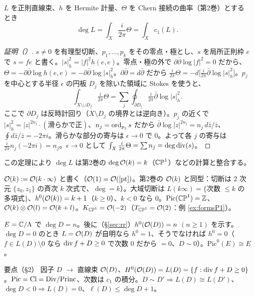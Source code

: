 \begin{thm}[$\deg=c_1$]\label{thm:degc1}
$L$ を正則直線束、$h$ を Hermite 計量、$\Theta$ を Chern 接続の曲率（第2巻）とするとき
\[
\deg L=\int_X\frac{i}{2\pi}\Theta=\int_Xc_1(L).
\]
\end{thm}
\begin{proof}[証明（\tP）]
$s\ne0$ を有理型切断、$p_1,\dots,p_k$ をその零点・極とし、$s$ を局所正則枠 $e$ で $s=fe$ と書く。$|s|^2_h=|f|^2h(e,e)$。零点・極の外で $\partial\bar\partial\log|f|^2=0$ だから、$\Theta=-\partial\bar\partial\log h(e,e)=-\partial\bar\partial\log|s|_h^2$。$\partial\bar\partial=d\bar\partial$ だから $\frac i{2\pi}\Theta=-d\bigl[\frac i{2\pi}\bar\partial\log|s|_h^2\bigr]$。$p_j$ を中心とする半径 $\epsilon$ の円板 $D_j$ を除いた領域に Stokes を使うと、
\[
\int_{X\setminus\cup D_j}\tfrac i{2\pi}\Theta=\sum_j\oint_{\partial D_j}\tfrac i{2\pi}\bar\partial\log|s|_h^2.
\]
ここで $\partial D_j$ は反時計回り（$X\setminus D_j$ の境界とは逆向き）。$p_j$ の近くで $|s|^2_h=|z|^{2n_j}\cdot(\text{滑らかで正})$、$n_j=\operatorname{ord}_{p_j}s$ だから $\bar\partial\log|z|^{2n_j}=n_j\,d\bar z/\bar z$、$\oint d\bar z/\bar z=-2\pi i$。滑らかな部分の寄与は $\epsilon\to0$ で $0$。よって各 $j$ の寄与は $\frac i{2\pi}n_j(-2\pi i)=n_j$。$\epsilon\to0$ として $\int_X\frac i{2\pi}\Theta=\sum n_j=\deg\operatorname{div}(s)$。 
\end{proof}
この定理により $\deg L$ は第2巻の $\deg\mathcal O(k)=k$（$\CP^1$）などの計算と整合する。

\begin{ex}[$\CP^1$ 上の $\Oc(k)$]\label{ex:Ok}
$\mathcal O(k):=\mathcal O(k\cdot\infty)$ と書く（$\mathcal O(1)=\mathcal O([\mathrm{pt}])$。第2巻の $\Oc(k)$ と同型：切断は 2 次元 $\{z_0,z_1\}$ の斉次 $k$ 次式で、$\deg=k$）。大域切断は $L(k\infty)=\{$次数 $\le k$ の多項式$\}$、$h^0(\mathcal O(k))=k+1$（$k\ge0$）、$k<0$ なら $0$。$\mathrm{Pic}(\mathbb{CP}^1)=\mathbb Z$、$\mathcal O(k)\otimes\mathcal O(l)=\mathcal O(k+l)$。$K_{\mathbb{CP}^1}=\mathcal O(-2)$（$T_{\mathbb{CP}^1}=\mathcal O(2)$：例 \ref{ex:formsP1}）。
\end{ex}
\begin{ex}[楕円曲線上]
$E=\mathbb C/\Lambda$ で $\deg D=n$。後に（\S\ref{sec:rr}）$h^0(\mathcal O(D))=n$ $(n\ge1)$ を示す。$\deg D=0$ のとき $L=\mathcal O(D)$ が自明なら $h^0=1$、そうでなければ $h^0=0$（$f\in L(D)\setminus0$ なら $\operatorname{div} f+D\ge0$ で次数 $0$ だから $=0$、$D\sim0$）。$\mathrm{Pic}^0(E)\cong E$。
\end{ex}

\begin{keybox}{要点（§2）}
因子 $D$ $\to$ 直線束 $\mathcal O(D)$、$H^0(\mathcal O(D))=L(D)=\{f:\operatorname{div} f+D\ge0\}$。$\mathrm{Pic}=\mathrm{Cl}=\mathrm{Div}/\mathrm{Princ}$、次数は $c_1$ の積分。$D\sim D'\Rightarrow L(D)\cong L(D')$、$\deg D<0\Rightarrow L(D)=0$、$\ell(D)\le\deg D+1$。
\end{keybox}

